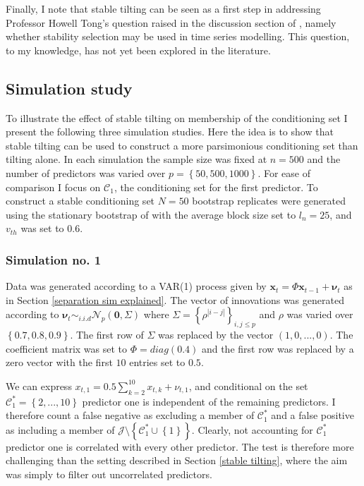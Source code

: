 \documentclass[11pt]{report}\usepackage[utf8]{inputenc}
\begin{document}
Finally, I note that stable tilting can be seen as a first step in addressing Professor Howell Tong's question raised in the discussion section of \cite{meinshausen2010stability}, namely whether stability selection may be used in time series modelling. This question, to my knowledge, has not yet been explored in the literature. 

\subsection{Simulation study}\label{stability simulation}

To illustrate the effect of stable tilting on membership of the conditioning set I present the following three simulation studies. Here the idea is to show that stable tilting can be used to construct a more parsimonious conditioning set than tilting alone. In each simulation the sample size was fixed at $n=500$ and the number of predictors was varied over $p=\left \{ 50,500,1000 \right \}$. For ease of comparison I focus on $\mathcal{C}_1$, the conditioning set for the first predictor. To construct a stable conditioning set $N=50$ bootstrap replicates were generated using the stationary bootstrap of \cite{politis1994stationary} with the average block size set to $l_n = 25$, and $v_{th}$ was set to $0.6$. 

\subsubsection{Simulation no. 1}

Data was generated according to a VAR(1) process given by $\mathbf{x}_t = \Phi \mathbf{x}_{t-1} + \boldsymbol{\nu}_t$ as in Section \ref{separation sim explained}. The vector of innovations was generated according to $\boldsymbol{\nu}_t \sim_{i.i.d} \mathcal{N}_p\left ( \mathbf{0}, \Sigma \right )$ where $\Sigma = \left \{ \rho^{|i-j|} \right \}_{i,j \leq p}$ and $\rho$ was varied over $\left \{ 0.7,0.8,0.9 \right \}$. The first row of $\Sigma$ was replaced by the vector $\left ( 1,0,...,0 \right )$. The coefficient matrix was set to $\Phi = \textit{diag}\left ( 0.4 \right )$ and the first row was replaced by a zero vector with the first $10$ entries set to $0.5$. 

We can express $x_{t,1} = 0.5\sum_{k=2}^{10}x_{t,k} +\nu_{t,1}$, and conditional on the set $\mathcal{C}_1^*=\left \{ 2,...,10 \right \}$ predictor one is independent of the remaining predictors. I therefore count a false negative as excluding a member of $\mathcal{C}_1^*$ and a false positive as including a member of $\mathcal{J} \setminus\left \{ \mathcal{C}_1^* \cup \left \{ 1 \right \} \right \}$. Clearly, not accounting for $\mathcal{C}_1^*$ predictor one is correlated with every other predictor. The test is therefore more challenging than the setting described in Section \ref{stable tilting}, where the aim was simply to filter out uncorrelated predictors. 
\end{document}
